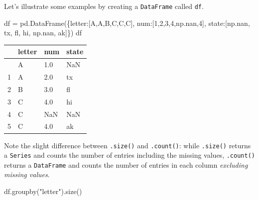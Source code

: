 \documentclass[
  letterpaper,
  DIV=11,
  numbers=noendperiod]{scrreprt}
\newenvironment{Shaded}{\begin{snugshade}}{\end{snugshade}}
\newcommand{\DecValTok}[1]{\textcolor[rgb]{0.68,0.00,0.00}{#1}}
\newcommand{\NormalTok}[1]{\textcolor[rgb]{0.00,0.23,0.31}{#1}}
\newcommand{\OperatorTok}[1]{\textcolor[rgb]{0.37,0.37,0.37}{#1}}
\newcommand{\StringTok}[1]{\textcolor[rgb]{0.13,0.47,0.30}{#1}}
\begin{document}
Let's illustrate some examples by creating a \texttt{DataFrame} called
\texttt{df}.

\begin{Shaded}
\begin{Highlighting}[]
\NormalTok{df }\OperatorTok{=}\NormalTok{ pd.DataFrame(\{}\StringTok{\textquotesingle{}letter\textquotesingle{}}\NormalTok{:[}\StringTok{\textquotesingle{}A\textquotesingle{}}\NormalTok{,}\StringTok{\textquotesingle{}A\textquotesingle{}}\NormalTok{,}\StringTok{\textquotesingle{}B\textquotesingle{}}\NormalTok{,}\StringTok{\textquotesingle{}C\textquotesingle{}}\NormalTok{,}\StringTok{\textquotesingle{}C\textquotesingle{}}\NormalTok{,}\StringTok{\textquotesingle{}C\textquotesingle{}}\NormalTok{], }
                   \StringTok{\textquotesingle{}num\textquotesingle{}}\NormalTok{:[}\DecValTok{1}\NormalTok{,}\DecValTok{2}\NormalTok{,}\DecValTok{3}\NormalTok{,}\DecValTok{4}\NormalTok{,np.nan,}\DecValTok{4}\NormalTok{], }
                   \StringTok{\textquotesingle{}state\textquotesingle{}}\NormalTok{:[np.nan, }\StringTok{\textquotesingle{}tx\textquotesingle{}}\NormalTok{, }\StringTok{\textquotesingle{}fl\textquotesingle{}}\NormalTok{, }\StringTok{\textquotesingle{}hi\textquotesingle{}}\NormalTok{, np.nan, }\StringTok{\textquotesingle{}ak\textquotesingle{}}\NormalTok{]\})}
\NormalTok{df}
\end{Highlighting}
\end{Shaded}

\begin{longtable}[]{@{}llll@{}}
\toprule\noalign{}
& letter & num & state \\
\midrule\noalign{}
\endhead
\bottomrule\noalign{}
\endlastfoot
0 & A & 1.0 & NaN \\
1 & A & 2.0 & tx \\
2 & B & 3.0 & fl \\
3 & C & 4.0 & hi \\
4 & C & NaN & NaN \\
5 & C & 4.0 & ak \\
\end{longtable}

Note the slight difference between \texttt{.size()} and
\texttt{.count()}: while \texttt{.size()} returns a \texttt{Series} and
counts the number of entries including the missing values,
\texttt{.count()} returns a \texttt{DataFrame} and counts the number of
entries in each column \emph{excluding missing values}.

\begin{Shaded}
\begin{Highlighting}[]
\NormalTok{df.groupby(}\StringTok{"letter"}\NormalTok{).size()}
\end{Highlighting}
\end{Shaded}
\end{document}
